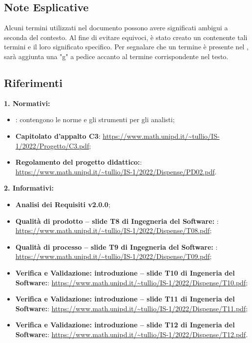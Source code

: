 \subsection{Note Esplicative}
Alcuni termini utilizzati nel documento possono avere significati ambigui a seconda del contesto. Al fine di evitare equivoci, è stato creato un \Glodocumento contenente tali termini 
e il loro significato specifico. Per segnalare che un termine è presente nel \Glodocumento, sarà aggiunta una "g" a pedice accanto al termine corrispondente nel testo.

\subsection{Riferimenti}
\textbf{1. Normativi:} 
\begin{itemize}
    \item \textbf{\NdPdocumento}: contengono le norme e gli strumenti per gli analisti;
    \item \textbf{Capitolato d’appalto C3}: \url{https://www.math.unipd.it/~tullio/IS-1/2022/Progetto/C3.pdf};
    \item \textbf{Regolamento del progetto didattico:}: \url{https://www.math.unipd.it/~tullio/IS-1/2022/Dispense/PD02.pdf}.
\end{itemize}

\textbf{2. Informativi:} 
\begin{itemize}
    \item \textbf{Analisi dei Requisiti v2.0.0};
    \item \textbf{Qualità di prodotto – slide T8 di Ingegneria del Software: }: \url{https://www.math.unipd.it/~tullio/IS-1/2022/Dispense/T08.pdf};
    \item \textbf{Qualità di processo – slide T9 di Ingegneria del Software: }: \url{https://www.math.unipd.it/~tullio/IS-1/2022/Dispense/T09.pdf};
    \item \textbf{Verifica e Validazione: introduzione – slide T10 di Ingeneria del Software:}: \url{https://www.math.unipd.it/~tullio/IS-1/2022/Dispense/T10.pdf};
    \item \textbf{Verifica e Validazione: introduzione – slide T11 di Ingeneria del Software:}: \url{https://www.math.unipd.it/~tullio/IS-1/2022/Dispense/T11.pdf};
    \item \textbf{Verifica e Validazione: introduzione – slide T12 di Ingeneria del Software:}: \url{https://www.math.unipd.it/~tullio/IS-1/2022/Dispense/T12.pdf}.

\end{itemize}

